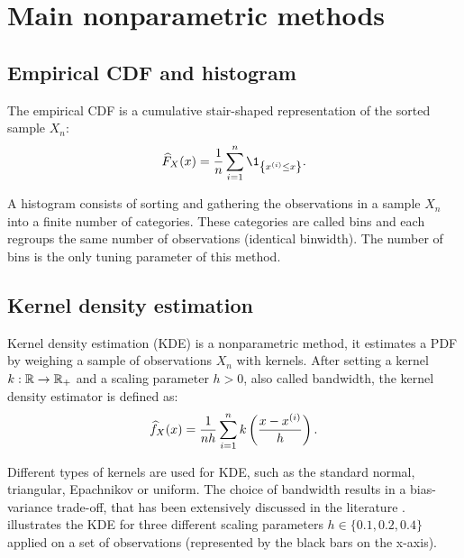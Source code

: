 \section*{Main nonparametric methods}


\subsection*{Empirical CDF and histogram}
The empirical CDF is a cumulative stair-shaped representation of the sorted sample $X_n$:
\begin{equation}
    \what{F}_X(x) = \frac1n \sum_{i=1}^{n} \1_{\left\{x^{(i)} \leq x\right\}}.
\end{equation}

A histogram consists of sorting and gathering the observations in a sample $X_n$ into a finite number of categories. 
These categories are called bins and each regroups the same number of observations (identical binwidth). 
The number of bins is the only tuning parameter of this method.

\subsection*{Kernel density estimation}
Kernel density estimation (KDE) is a nonparametric method, it estimates a PDF by weighing a sample of observations $X_n$ with kernels.  
After setting a kernel $k: \mathbb{R} \rightarrow \mathbb{R}_+$ and a scaling parameter $h>0$, also called bandwidth, the kernel density estimator is defined as:
\begin{equation}
    \widehat{f}_X(x) = \frac{1}{n h}\sum_{i=1}^{n} k\left(\frac{x - x^{(i)}}{h}\right).
\end{equation}

Different types of kernels are used for KDE, such as the standard normal, triangular, Epachnikov or uniform. 
The choice of bandwidth results in a bias-variance trade-off, that has been extensively discussed in the literature \citep{wand_jones_1994_kde}.
 illustrates the KDE for three different scaling parameters $h\in\{0.1, 0.2, 0.4\}$ applied on a set of observations (represented by the black bars on the x-axis). 

